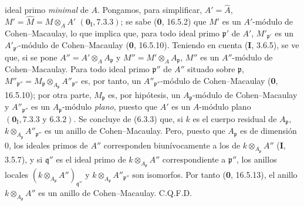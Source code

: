 ideal primo \emph{minimal} de $A$. Pongamos, para simplificar,
$A'=\widehat A$, $M'=\widehat M=M\otimes_AA'$ $(\mathbf{0}_{\mathrm I}, 7.3.3)$; se
sabe (\textbf 0, 16.5.2) que $M'$ es un $A'$-módulo de Cohen--Macaulay, lo que implica
que, para todo ideal primo $\mathfrak p'$ de $A'$,
$M'_{\mathfrak p'}$ es un $A'_{\mathfrak p'}$-módulo de Cohen--Macaulay
(\textbf 0, 16.5.10). Teniendo en cuenta (\textbf I, 3.6.5), se ve que, si se pone
$A''=A'\otimes_AA_{\mathfrak p}$ y
$M''=M'\otimes_AA_{\mathfrak p}$, $M''$ es un $A''$-módulo de
Cohen--Macaulay. Para todo ideal primo $\mathfrak p''$ de $A''$ situado sobre
$\mathfrak p$,
$M''_{\mathfrak p''}=M_{\mathfrak p}\otimes_{A_{\mathfrak p}}
A''_{\mathfrak p''}$ es, por tanto, un $A''_{\mathfrak p''}$-módulo de
Cohen--Macaulay (\textbf 0, 16.5.10); por otra parte, $M_{\mathfrak p}$ es, por
hipótesis, un $A_{\mathfrak p}$-módulo de Cohen--Macaulay y
$A''_{\mathfrak p''}$ es un $A_{\mathfrak p}$-módulo \emph{plano}, puesto que $A'$
es un $A$-módulo plano $(\mathbf{0}_{\mathrm I}, 7.3.3\text{ y }6.3.2)$. Se concluye
de (6.3.3) que, si $k$ es el cuerpo residual de $A_{\mathfrak p}$,
$k\otimes_{A_{\mathfrak p}}A''_{\mathfrak p''}$ es un anillo de
Cohen--Macaulay. Pero, puesto que $A_{\mathfrak p}$ es de dimensión $0$, los
ideales primos de $A''$ corresponden biunívocamente a los de
$k\otimes_{A_{\mathfrak p}}A''$ (\textbf I, 3.5.7), y si $\mathfrak q''$ es el ideal
primo de $k\otimes_{A_{\mathfrak p}}A''$ correspondiente a
$\mathfrak p''$, los anillos locales
$(k\otimes_{A_{\mathfrak p}}A'')_{\mathfrak q''}$ y
$k\otimes_{A_{\mathfrak p}}A''_{\mathfrak p''}$ son isomorfos. Por tanto
(\textbf 0, 16.5.13), el anillo $k\otimes_{A_{\mathfrak p}}A''$ es un anillo de
Cohen--Macaulay. C.Q.F.D.
